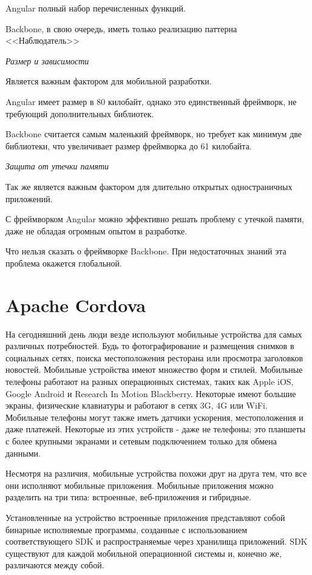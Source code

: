 Angular полный набор перечисленных функций.

Backbone, в свою очередь, иметь только реализацию паттерна <<Наблюдатель>>

{\itshape Размер и зависимости} 

Является важным фактором для мобильной разработки.

Angular имеет размер в 80 килобайт, однако это единственный фреймворк, не требующий дополнительных библиотек.

Backbone считается самым маленький фреймворк, но требует как минимум две библиотеки, что увеличивает размер фреймворка до 61 килобайта.

{\itshape Защита от утечки памяти} 

Так же является важным фактором для длительно открытых одностраничных приложений.

С фреймворком Angular можно эффективно решать проблему с утечкой памяти, даже не обладая огромным опытом в разработке.

Что нельзя сказать о фреймворке Backbone. При недостаточных знаний эта проблема окажется глобальной.

\section{Apache Cordova}
На сегодняшний день люди везде используют мобильные устройства для самых различных потребностей. Будь то фотографирование и размещения снимков в социальных сетях, поиска местоположения ресторана или просмотра заголовков новостей. Мобильные устройства имеют множество форм и стилей. Мобильные телефоны работают на разных операционных системах, таких как Apple iOS, Google Android и Research In Motion Blackberry. Некоторые имеют большие экраны, физические клавиатуры и работают в сетях 3G, 4G или WiFi. Мобильные телефоны могут также иметь датчики ускорения, местоположения и даже платежей. Некоторые из этих устройств - даже не телефоны; это планшеты с более крупными экранами и сетевым подключением только для обмена данными.

Несмотря на различия, мобильные устройства похожи друг на друга тем, что все они исполняют мобильные приложения. Мобильные приложения можно разделить на три типа: встроенные, веб-приложения и гибридные.

Установленные на устройство встроенные приложения представляют собой бинарные исполняемые программы, созданные с использованием соответствующего  SDK  и  распространяемые  через  хранилища приложений. SDK существуют для каждой мобильной операционной системы и, конечно же, различаются между собой.

